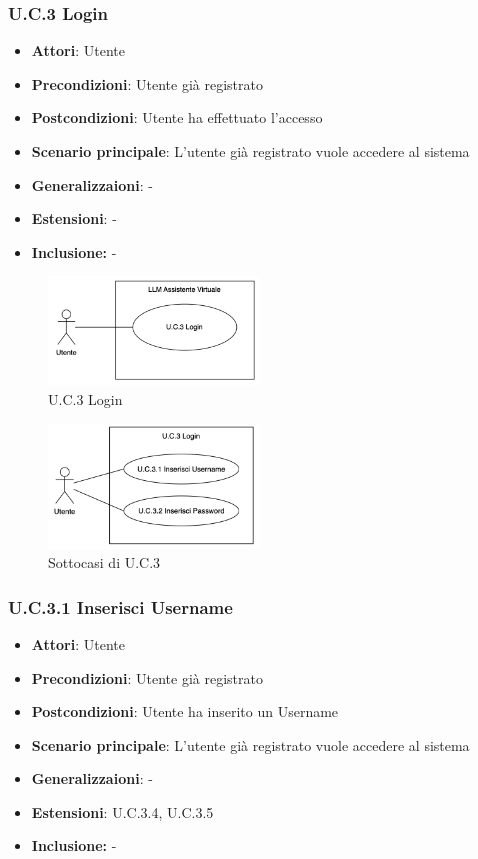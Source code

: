 \subsubsection{U.C.3 Login}
\begin{itemize}
    \item \textbf{Attori}: Utente
    \item \textbf{Precondizioni}: Utente già registrato
    \item \textbf{Postcondizioni}: Utente ha effettuato l'accesso
    \item \textbf{Scenario principale}: L'utente già registrato vuole accedere al sistema
    \item \textbf{Generalizzaioni}: -
    \item \textbf{Estensioni}: -
    \item \textbf{Inclusione:} -
\end{itemize}
\begin{figure}[h!]
    \centering
    \includegraphics[width=0.5\textwidth]{img/UC3.png}
    \caption{U.C.3 Login}
\end{figure}
\begin{figure}[h!]
    \centering
    \includegraphics[width=0.5\textwidth]{img/UC3p1.png}
    \caption{Sottocasi di U.C.3}
\end{figure}
\subsubsection{U.C.3.1 Inserisci Username}
\begin{itemize}
    \item \textbf{Attori}: Utente
    \item \textbf{Precondizioni}: Utente già registrato
    \item \textbf{Postcondizioni}: Utente ha inserito un Username
    \item \textbf{Scenario principale}: L'utente già registrato vuole accedere al sistema
    \item \textbf{Generalizzaioni}: -
    \item \textbf{Estensioni}: U.C.3.4, U.C.3.5
    \item \textbf{Inclusione:} -
\end{itemize}
